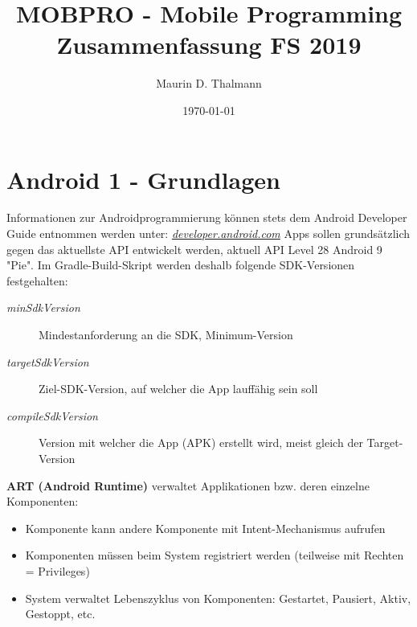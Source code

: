 \documentclass[a4paper]{article}
\title{\textbf{MOBPRO - Mobile Programming\\
Zusammenfassung FS 2019}}
\date{\today}
\author{Maurin D. Thalmann}
\begin{document}
	\maketitle
	\newpage
	\tableofcontents
	\newpage	
	
\section{Android 1 - Grundlagen}
	Informationen zur Androidprogrammierung können stets dem Android Developer Guide entnommen werden unter: \textit{\href{https://developer.android.com/}{developer.android.com}}
	Apps sollen grundsätzlich gegen das aktuellste API entwickelt werden, aktuell API Level 28 Android 9 "Pie".
	Im Gradle-Build-Skript werden deshalb folgende SDK-Versionen festgehalten:
\vspace{1em}
	\begin{description}
		\item[\textit{minSdkVersion}] Mindestanforderung an die SDK, Minimum-Version
		\item[\textit{targetSdkVersion}] Ziel-SDK-Version, auf welcher die App lauffähig sein soll
		\item[\textit{compileSdkVersion}] Version mit welcher die App (APK) erstellt wird, meist gleich der Target-Version	
	\end{description}
\vspace{1em}
	\textbf{ART (Android Runtime)} verwaltet Applikationen bzw. deren einzelne Komponenten:
	\begin{itemize}
		\item Komponente kann andere Komponente mit Intent-Mechanismus aufrufen
		\item Komponenten müssen beim System registriert werden (teilweise mit Rechten = Privileges)
		\item System verwaltet Lebenszyklus von Komponenten: Gestartet, Pausiert, Aktiv, Gestoppt, etc.
	\end{itemize}
\end{document}
